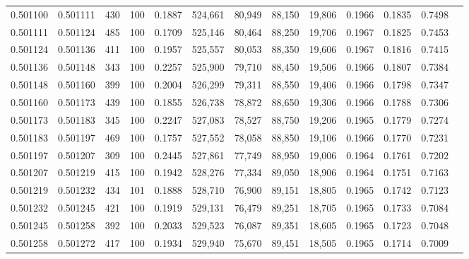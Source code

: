 \begin{tabular}{rrrrrrrrrrrrr}
0.501100 & 0.501111 &   430 & 100 &                                     0.1887 & 524,661 &  80,949 &  88,150 &  19,806 & 0.1966 & 0.1835 & 0.7498 \\
0.501111 & 0.501124 &   485 & 100 &                                     0.1709 & 525,146 &  80,464 &  88,250 &  19,706 & 0.1967 & 0.1825 & 0.7453 \\
0.501124 & 0.501136 &   411 & 100 &                                     0.1957 & 525,557 &  80,053 &  88,350 &  19,606 & 0.1967 & 0.1816 & 0.7415 \\
0.501136 & 0.501148 &   343 & 100 &                                     0.2257 & 525,900 &  79,710 &  88,450 &  19,506 & 0.1966 & 0.1807 & 0.7384 \\
0.501148 & 0.501160 &   399 & 100 &                                     0.2004 & 526,299 &  79,311 &  88,550 &  19,406 & 0.1966 & 0.1798 & 0.7347 \\
0.501160 & 0.501173 &   439 & 100 &                                     0.1855 & 526,738 &  78,872 &  88,650 &  19,306 & 0.1966 & 0.1788 & 0.7306 \\
0.501173 & 0.501183 &   345 & 100 &                                     0.2247 & 527,083 &  78,527 &  88,750 &  19,206 & 0.1965 & 0.1779 & 0.7274 \\
0.501183 & 0.501197 &   469 & 100 &                                     0.1757 & 527,552 &  78,058 &  88,850 &  19,106 & 0.1966 & 0.1770 & 0.7231 \\
0.501197 & 0.501207 &   309 & 100 &                                     0.2445 & 527,861 &  77,749 &  88,950 &  19,006 & 0.1964 & 0.1761 & 0.7202 \\
0.501207 & 0.501219 &   415 & 100 &                                     0.1942 & 528,276 &  77,334 &  89,050 &  18,906 & 0.1964 & 0.1751 & 0.7163 \\
0.501219 & 0.501232 &   434 & 101 &                                     0.1888 & 528,710 &  76,900 &  89,151 &  18,805 & 0.1965 & 0.1742 & 0.7123 \\
0.501232 & 0.501245 &   421 & 100 &                                     0.1919 & 529,131 &  76,479 &  89,251 &  18,705 & 0.1965 & 0.1733 & 0.7084 \\
0.501245 & 0.501258 &   392 & 100 &                                     0.2033 & 529,523 &  76,087 &  89,351 &  18,605 & 0.1965 & 0.1723 & 0.7048 \\
0.501258 & 0.501272 &   417 & 100 &                                     0.1934 & 529,940 &  75,670 &  89,451 &  18,505 & 0.1965 & 0.1714 & 0.7009 \\

\end{tabular}
